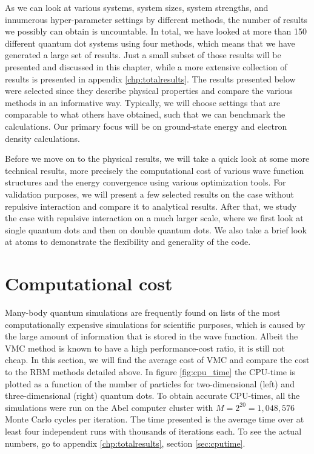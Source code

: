 As we can look at various systems, system sizes, system strengths, and innumerous hyper-parameter settings by different methods, the number of results we possibly can obtain is uncountable. In total, we have looked at more than 150 different quantum dot systems using four methods, which means that we have generated a large set of results. Just a small subset of those results will be presented and discussed in this chapter, while a more extensive collection of results is presented in appendix \ref{chp:totalresults}. The results presented below were selected since they describe physical properties and compare the various methods in an informative way. Typically, we will choose settings that are comparable to what others have obtained, such that we can benchmark the calculations. Our primary focus will be on ground-state energy and electron density calculations. 

Before we move on to the physical results, we will take a quick look at some more technical results, more precisely the computational cost of various wave function structures and the energy convergence using various optimization tools. For validation purposes, we will present a few selected results on the case without repulsive interaction and compare it to analytical results. After that, we study the case with repulsive interaction on a much larger scale, where we first look at single quantum dots and then on double quantum dots. We also take a brief look at atoms to demonstrate the flexibility and generality of the code. 

\section{Computational cost}
Many-body quantum simulations are frequently found on lists of the most computationally expensive simulations for scientific purposes, which is caused by the large amount of information that is stored in the wave function. Albeit the VMC method is known to have a high performance-cost ratio, it is still not cheap. In this section, we will find the average cost of VMC and compare the cost to the RBM methods detailed above. In figure \eqref{fig:cpu_time} the CPU-time is plotted as a function of the number of particles for two-dimensional (left) and three-dimensional (right) quantum dots. To obtain accurate CPU-times, all the simulations were run on the Abel computer cluster with $M=2^{20}=1,048,576$ Monte Carlo cycles per iteration. The time presented is the average time over at least four independent runs with thousands of iterations each. To see the actual numbers, go to appendix \ref{chp:totalresults}, section \ref{sec:cputime}. 


